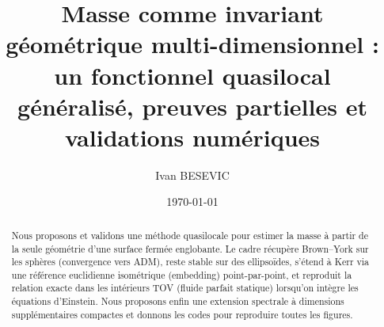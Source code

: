 \documentclass[11pt]{article}
\title{Masse comme invariant g\'eom\'etrique multi-dimensionnel : \\ 
un fonctionnel quasilocal g\'en\'eralis\'e, preuves partielles et validations num\'eriques}
\author{Ivan BESEVIC}
\date{\today}
\begin{document}
\maketitle

\begin{abstract}
Nous proposons et validons une m\'ethode quasilocale pour estimer la masse \`a partir de la seule g\'eom\'etrie d'une surface ferm\'ee englobante. 
Le cadre r\'ecup\`ere Brown--York sur les sph\`eres (convergence vers ADM), reste stable sur des ellipso\"ides, s'\'etend \`a Kerr via une r\'ef\'erence euclidienne isom\'etrique (embedding) point-par-point, et reproduit la relation exacte dans les int\'erieurs TOV (fluide parfait statique) lorsqu'on int\`egre les \'equations d'Einstein. 
Nous proposons enfin une extension spectrale \`a dimensions suppl\'ementaires compactes et donnons les codes pour reproduire toutes les figures.
\end{abstract}
\end{document}
